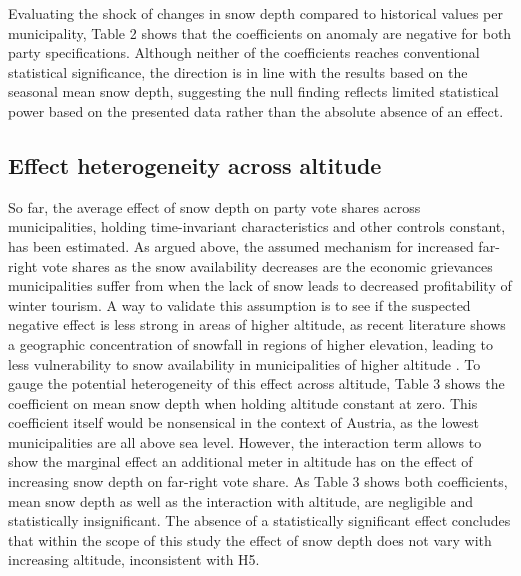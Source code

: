 \documentclass{article}
\begin{document}
Evaluating the shock of changes in snow depth compared to historical values per municipality, Table 2 shows that the coefficients on anomaly are negative for both party specifications. Although neither of the coefficients reaches conventional statistical significance, the direction is in line with the results based on the seasonal mean snow depth, suggesting the null finding reflects limited statistical power based on the presented data rather than the absolute absence of an effect. 

\vspace{2em}
\begin{table}[H]
  \caption{\textit{Effect of Mean Snow Depth on Vote Shares}}
  \label{tab:mean}
  
\end{table}
\vspace{2em}


\begin{table}[H]
  \caption{\textit{Effect of Snow Anomaly on Vote Shares}}
  \label{tab:anomaly}
  
\end{table}
\newpage


\subsection{Effect heterogeneity across altitude}
So far, the average effect of snow depth on party vote shares across municipalities, holding time-invariant characteristics and other controls constant, has been estimated. As argued above, the assumed mechanism for increased  far-right vote shares as the snow availability decreases are the economic grievances  municipalities suffer from when the lack of snow leads to decreased profitability of winter tourism. A way to validate this assumption is to see if the suspected negative effect is less strong in areas of higher altitude, as recent literature shows a geographic concentration of snowfall in regions of higher elevation, leading to less vulnerability to snow availability in municipalities of higher altitude \parencite{li2025}. To gauge the potential heterogeneity of this effect across altitude, Table 3 shows the coefficient on mean snow depth when holding altitude constant at zero. This coefficient itself would be nonsensical in the context of Austria, as the lowest municipalities are all above sea level. However, the interaction term allows to show the marginal effect an additional meter in altitude has on the effect of increasing snow depth on far-right vote share. As Table 3 shows both coefficients, mean snow depth as well as the interaction with altitude, are negligible and statistically insignificant. The absence of a statistically significant effect concludes that within the scope of this study the effect of snow depth does not vary with increasing altitude, inconsistent with H5. 
\end{document}
